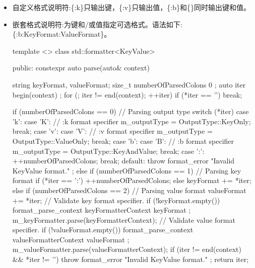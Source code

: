 \begin{itemize}
\item
自定义格式说明符:\{:k\}只输出键，\{:v\}只输出值，\{:b\}和\{\}同时输出键和值。

\item
嵌套格式说明符:为键和/或值指定可选格式。语法如下:\{:b:KeyFormat:ValueFormat\}。

\begin{cpp}
template <>
class std::formatter<KeyValue>
{
    public:
        constexpr auto parse(auto& context)
        {
            string keyFormat, valueFormat;
            size_t numberOfParsedColons { 0 };
            auto iter { begin(context) };
            for (; iter != end(context); ++iter) {
                if (*iter == '}') { break; }

                if (numberOfParsedColons == 0) { // Parsing output type
                    switch (*iter) {
                        case 'k': case 'K': // {:k format specifier
                            m_outputType = OutputType::KeyOnly; break;
                        case 'v': case 'V': // {:v format specifier
                            m_outputType = OutputType::ValueOnly; break;
                        case 'b': case 'B': // {:b format specifier
                            m_outputType = OutputType::KeyAndValue; break;
                        case ':':
                            ++numberOfParsedColons; break;
                        default:
                            throw format_error { "Invalid KeyValue format." };
                    }
                } else if (numberOfParsedColons == 1) { // Parsing key format
                    if (*iter == ':') { ++numberOfParsedColons; }
                    else { keyFormat += *iter; }
                } else if (numberOfParsedColons == 2) { // Parsing value format
                    valueFormat += *iter;
                }
            }
            // Validate key format specifier.
            if (!keyFormat.empty()) {
                format_parse_context keyFormatterContext { keyFormat };
                m_keyFormatter.parse(keyFormatterContext);
            }
            // Validate value format specifier.
            if (!valueFormat.empty()) {
                format_parse_context valueFormatterContext { valueFormat };
                m_valueFormatter.parse(valueFormatterContext);
            }
            if (iter != end(context) && *iter != '}') {
                throw format_error { "Invalid KeyValue format." };
            }
            return iter;
        }

}}
\end{cpp}
\end{itemize}
